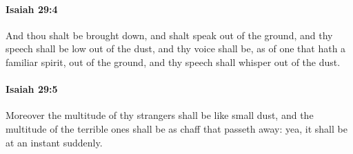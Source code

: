 		\paragraph{Isaiah 29:4} %
			\label{ISAIAH-29-4}

			And thou shalt be brought down, and shalt speak out of the ground, and thy speech shall be low out of the dust, and thy voice shall be, as of one that hath a familiar spirit, out of the ground, and thy speech shall whisper out of the dust.


		\paragraph{Isaiah 29:5} %
			\label{ISAIAH-29-5}

			Moreover the multitude of thy strangers shall be like small dust, and the multitude of the terrible ones shall be as chaff that passeth away: yea, it shall be at an instant suddenly.


